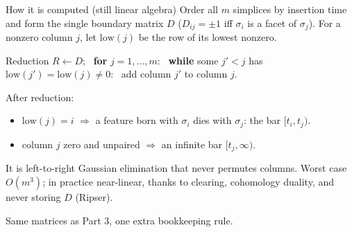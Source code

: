 \documentclass[10pt,aspectratio=169]{beamer}
\begin{document}
    \begin{frame}{How it is computed (still linear algebra)}
        \small
        Order all $m$ simplices by insertion time and form the single boundary matrix
        $D$ ($D_{ij}=\pm1$ iff $\sigma_i$ is a facet of $\sigma_j$).
        For a nonzero column $j$, let $\mathrm{low}(j)$ be the row of its lowest nonzero.

        \begin{block}{Reduction}
            \scriptsize
            $R\leftarrow D$; \ \textbf{for} $j=1,\dots,m$: \ \textbf{while} some $j'<j$ has
            $\mathrm{low}(j')=\mathrm{low}(j)\neq0$: \ add column $j'$ to column $j$.
        \end{block}

        After reduction:
        \begin{itemize}
            \small
            \item $\mathrm{low}(j)=i$ $\Rightarrow$ a feature born with $\sigma_i$ dies with
            $\sigma_j$: the bar $[t_i,t_j)$.
            \item column $j$ zero and unpaired $\Rightarrow$ an infinite bar $[t_j,\infty)$.
        \end{itemize}

        \vspace{0.4em}

        It is left-to-right Gaussian elimination that never permutes columns.
        Worst case $O(m^3)$; in practice near-linear, thanks to clearing, cohomology
        duality, and never storing $D$ (Ripser).

        \vspace{0.4em}
        \begin{center}
            \alert{Same matrices as Part 3, one extra bookkeeping rule.}
        \end{center}
    \end{frame}
\end{document}
